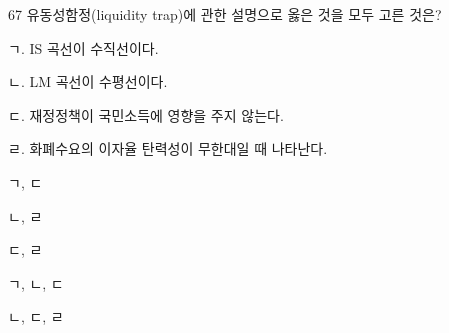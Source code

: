 \begin{question}{67}
유동성함정(liquidity trap)에 관한 설명으로 옳은 것을 모두 고른 것은?
\begin{framedtext}
ㄱ. IS 곡선이 수직선이다. \par
ㄴ. LM 곡선이 수평선이다. \par
ㄷ. 재정정책이 국민소득에 영향을 주지 않는다. \par
ㄹ. 화폐수요의 이자율 탄력성이 무한대일 때 나타난다. \par
\end{framedtext}
\begin{choices}
  \item ㄱ, ㄷ
  \item ㄴ, ㄹ
  \item ㄷ, ㄹ
  \item ㄱ, ㄴ, ㄷ
  \item ㄴ, ㄷ, ㄹ
\end{choices}
\end{question}
